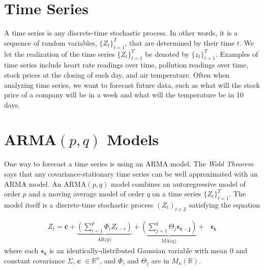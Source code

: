 \label{lab:arma}

\section*{Time Series}


A time series is any discrete-time stochastic process.  
In other words, it is a sequence of random variables, $\{Z_t\}_{t=1}^T$, that are determined by their time $t$.  We let the realization of the time series $\{Z_t\}_{t=1}^T$ be denoted by $\{z_t\}_{t=1}^T$.
Examples of time series include heart rate readings over time, pollution readings over time, stock prices at the closing of each day, and air temperature.
Often when analyzing time series, we want to forecast future data, such as what will the stock price of a company will be in a week and what will the temperature be in 10 days.

\section*{ARMA$(p,q)$ Models}

One way to forecast a time series is using an ARMA model.
The \emph{Wold Theorem} says that any covariance-stationary time series can be well approximated with an ARMA model.
An $\text{ARMA}(p,q)$ model combines an autoregressive model of order $p$ and a moving average model of order $q$ on a time series $\{Z_t\}_{t = 1}^T$.
The model itself is a discrete-time stochastic process $(Z_t)_{t \in \mathbb{Z}}$ satisfying the equation

\begin{align}
    \label{eq:arma:def}
    Z_t = \mathbf{c} + \underbrace{\left(\sum_{i=1}^p \Phi_{i}Z_{t - i}\right)}_\text{AR(p)} +
    \underbrace{\left(\sum_{j=1}^{q} \Theta_{j} \boldsymbol{\epsilon_{t-j}} \right)}_\text{MA(q)} + \text{ }\boldsymbol{\epsilon_t}
\end{align}
where each $\boldsymbol{\epsilon_t}$ is an identically-distributed Gaussian variable with mean 0 and constant covariance $\Sigma$, \textbf{c} $\in \mathbb{R}^n$, and $\Phi_i$ and $\Theta_j$ are in $M_n(\mathbb{R})$.

